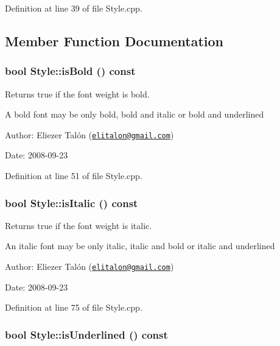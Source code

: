 Definition at line 39 of file Style.cpp.

\subsection{Member Function Documentation}
\hypertarget{class_style_59d23709575c5e6e5434ef0af5ff94b6}{
\subsubsection[isBold]{\setlength{\rightskip}{0pt plus 5cm}bool Style::isBold () const}}
\label{class_style_59d23709575c5e6e5434ef0af5ff94b6}


Returns true if the font weight is bold. 

A bold font may be only bold, bold and italic or bold and underlined

\begin{Desc}
\item[Author:]Eliezer Talón (\href{mailto:elitalon@gmail.com}{\tt elitalon@gmail.com}) \end{Desc}
\begin{Desc}
\item[Date:]2008-09-23 \end{Desc}


Definition at line 51 of file Style.cpp.\hypertarget{class_style_5d57a686b93123e8ca5f8f91afb596c1}{
\subsubsection[isItalic]{\setlength{\rightskip}{0pt plus 5cm}bool Style::isItalic () const}}
\label{class_style_5d57a686b93123e8ca5f8f91afb596c1}


Returns true if the font weight is italic. 

An italic font may be only italic, italic and bold or italic and underlined

\begin{Desc}
\item[Author:]Eliezer Talón (\href{mailto:elitalon@gmail.com}{\tt elitalon@gmail.com}) \end{Desc}
\begin{Desc}
\item[Date:]2008-09-23 \end{Desc}


Definition at line 75 of file Style.cpp.\hypertarget{class_style_d1fcc32d8b565aae007012eb603fedcd}{
\subsubsection[isUnderlined]{\setlength{\rightskip}{0pt plus 5cm}bool Style::isUnderlined () const}}
\label{class_style_d1fcc32d8b565aae007012eb603fedcd}



